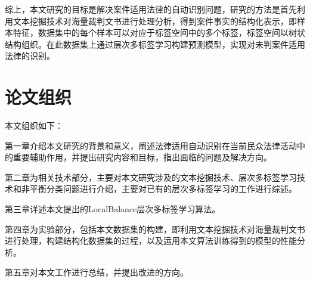     综上，本文研究的目标是解决案件适用法律的自动识别问题，研究的方法是首先利用文本挖掘技术对海量裁判文书进行处理分析，得到案件事实的结构化表示，即样本特征，数据集中的每个样本可以对应于标签空间中的多个标签，标签空间以树状结构组织。在此数据集上通过层次多标签学习构建预测模型，实现对未判案件适用法律的识别。


    \section{论文组织}
    本文组织如下：

    第一章介绍本文研究的背景和意义，阐述法律适用自动识别在当前民众法律活动中的重要辅助作用，并提出研究内容和目标，指出面临的问题及解决方向。

    第二章为相关技术部分，主要对本文研究涉及的文本挖掘技术、层次多标签学习技术和非平衡分类问题进行介绍，主要对已有的层次多标签学习的工作进行综述。

    第三章详述本文提出的LocalBalance层次多标签学习算法。

    第四章为实验部分，包括本文数据集的构建，即利用文本挖掘技术对海量裁判文书进行处理，构建结构化数据集的过程，以及运用本文算法训练得到的模型的性能分析。

    第五章对本文工作进行总结，并提出改进的方向。
